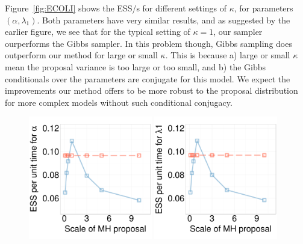   Figure~\ref{fig:ECOLI} shows the ESS/s for different settings of $\kappa$, for parameters $(\alpha, \lambda_1)$. 
  Both parameters have very similar results, and as suggested by the earlier figure, we see that for the typical setting of $\kappa=1$, our sampler ourperforms the Gibbs sampler. 
  In this problem though, Gibbs sampling does outperform our method for large or small $\kappa$. 
  This is because a) large or small $\kappa$ mean the proposal variance is too large or too small, and b) the Gibbs conditionals over the parameters are conjugate for this model. 
  We expect the improvements our method offers to be more robust to the proposal distribution for more complex models without such conditional conjugacy.
  \begin{figure}[H]
  \centering
  \begin{minipage}[!hp]{.68\linewidth}
	\includegraphics [width=0.48\textwidth, angle=0]{figs/new_experiment_figs/ecoli_alpha.pdf}
	\includegraphics [width=0.48\textwidth, angle=0]{figs/new_experiment_figs/ecoli_l1.pdf}

\end{minipage}
\end{figure}
